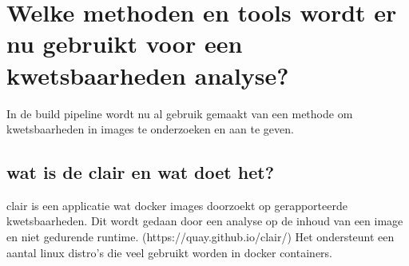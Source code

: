 \section{Welke methoden en tools wordt er nu gebruikt voor een kwetsbaarheden analyse?}
In de build pipeline wordt nu al gebruik gemaakt van een methode om kwetsbaarheden in images te onderzoeken en aan te geven.
\subsection{wat is de clair en wat doet het?}
clair is een applicatie wat docker images doorzoekt op gerapporteerde kwetsbaarheden. Dit wordt gedaan door een analyse op de inhoud van een image en niet gedurende runtime. (https://quay.github.io/clair/) Het ondersteunt een aantal linux distro's die veel gebruikt worden in docker containers. 
